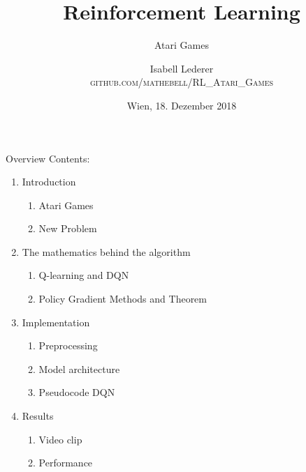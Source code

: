 \documentclass{beamer}
\title{Reinforcement Learning}
\subtitle{Atari Games}
\author{Isabell Lederer\\
\small \textsc{github.com/mathebell/RL\_Atari\_Games}}
\institute[TU Wien] %
{AKNUM Maschinelles Lernen SE}
\date{Wien, 18. Dezember 2018}
\begin{document}
\begin{frame}
  \titlepage
\end{frame}
\begin{frame}{Overview}
			Contents:
			\begin{enumerate}
				\item Introduction
				\begin{enumerate}
					\item Atari Games
					\item New Problem
				\end{enumerate}
				\item The mathematics behind the algorithm
				\begin{enumerate}
					\item Q-learning and DQN
					\item Policy Gradient Methods and Theorem
				\end{enumerate}
				\item Implementation
				\begin{enumerate}
					\item Preprocessing
					\item Model architecture
					\item Pseudocode DQN
				\end{enumerate}
				\item Results
				\begin{enumerate}
					\item Video clip
					\item Performance
				\end{enumerate}
				

			\end{enumerate}
\end{frame}
\end{document}
